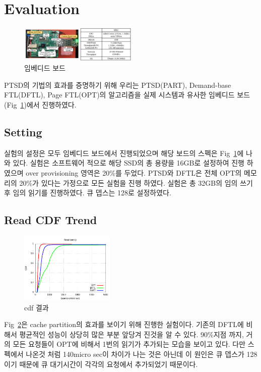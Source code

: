 \documentclass[conference]{IEEEtran}
\begin{document}
\section{Evaluation}
\begin{figure}[h]
	\centering
	\includegraphics[width=0.5\textwidth]{image/EVAL/zync.png}
	\caption{임베디드 보드}
	\label{fig:zync}
\end{figure}
PTSD의 기법의 효과를 증명하기 위해 우리는 PTSD(PART), Demand-base FTL(DFTL), Page FTL(OPT)의 
알고리즘을 실제 시스템과 유사한 임베디드 보드(Fig~\ref{fig:zync})에서 진행하였다.

\subsection{Setting}
실험의 설정은 모두 임베디드 보드에서 진행되었으며 해당 보드의 스펙은 Fig~\ref{fig:zync}에 나와 있다.
실험은 소프트웨어 적으로 해당 SSD의 총 용량을 16GB로 설정하여 진행 하였으며 over provisioning 영역은
20\%를 두었다. PTSD와 DFTL은 전체 OPT의 메모리의 20\%가 있다는 가정으로 모든 실험을 진행 하였다. 
실험은 총 32GB의 임의 쓰기후 임의 읽기를 진행하였다. 큐 뎁스는 128로 설정하였다.

\subsection{Read CDF Trend}
\begin{figure}[h]
	\centering
	\includegraphics[width=0.4\textwidth]{image/EVAL/cdf.png}
	\caption{cdf 결과}
	\label{fig:cdf1}
\end{figure}
Fig~\ref{fig:cdf1}은 cache partition의 효과를 보이기 위해 진행한 실험이다. 기존의 DFTL에 비해서 
평균적인 성능이 상당히 많은 부분 앞당겨 진것을 알 수 있다. 90\%지점 까지, 거의 모든 요청들이 
OPT에 비해서 1번의 읽기가 추가되는 모습을 보이고 있다. 다만 스펙에서 나온것 처럼 140micro sec이 
차이가 나는 것은 아닌데 이 원인은 큐 뎁스가 128이기 때문에 큐 대기시간이 각각의 요청에서 
추가되었기 때문이다. \par
\end{document}

